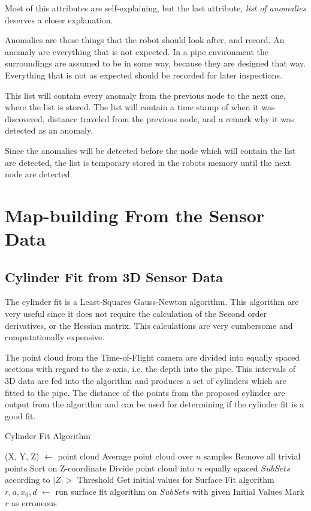 Most of this attributes are self-explaining, but the last attribute, \emph{list of
anomalies} deserves a closer explanation. 

Anomalies are those things that the robot should look after, and record. An anomaly are
everything that is not expected. In a pipe environment the surroundings are assumed to be
in some way, because they are designed that way. Everything that is not as expected should
be recorded for later inspections. 

This list will contain every anomaly from the previous node to the next one, where the
list is stored. The list will contain a time stamp of when it was discovered, distance
traveled from the previous node, and a remark why it was detected as an anomaly. 

Since the anomalies will be detected before the node which will contain the list are
detected, the list is temporary stored in the robots memory until the next node are
detected. 


\section{Map-building From the Sensor Data}


\subsection{Cylinder Fit from 3D Sensor Data}
The cylinder fit is a Least-Squares Gauss-Newton algorithm. This algorithm are very
useful since it does not require the calculation of the Second order derivatives, or the
Hessian matrix. This calculations are very cumbersome and computationally expensive. 

The point cloud from the Time-of-Flight camera are divided into equally spaced
sections with regard to the z-axis, i.e. the depth into the pipe. This intervals of 3D
data are fed into the algorithm and produces a set of cylinders which are fitted to the
pipe. The distance of the points from the proposed cylinder are output from the algorithm
and can be used for determining if the cylinder fit is a good fit. 
\begin{algorithm}
    \caption{Cylinder Fit Algorithm}
    \label{chap5:alg-cylinderfit}
    \begin{algorithmic}
        \REQUIRE (X, Y, Z) $\leftarrow$ point cloud
        \STATE Average point cloud over $n$ samples
        \STATE Remove all trivial points
        \STATE Sort on Z-coordinate
        \STATE Divide point cloud into $n$ equally spaced $SubSets$ according to $|Z| >$
        Threshold
            \STATE Get initial values for Surface Fit algorithm
            \STATE  $r, a, x_0, d$ $\leftarrow$ run surface fit algorithm on $SubSets$
            with given Initial Values
        \ENDFOR
                \STATE Mark $r$ as erroneous
            \ENDIF
        \ENDFOR
    \end{algorithmic}
\end{algorithm}

